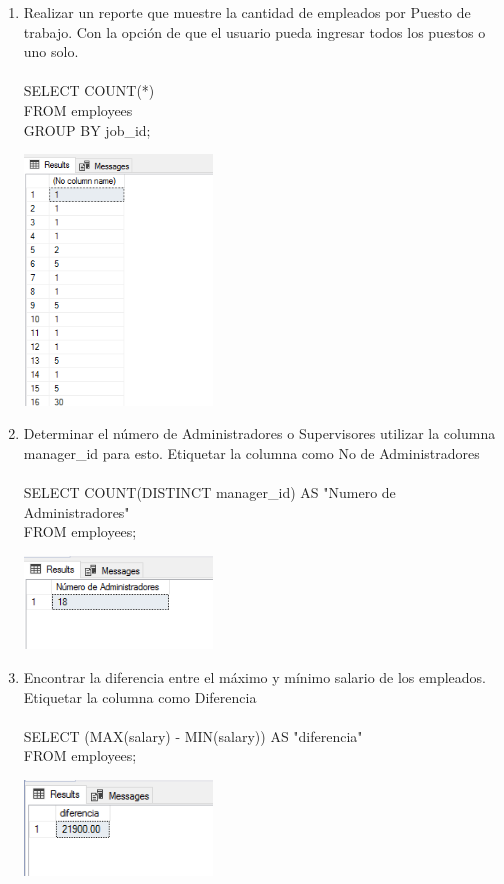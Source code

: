 \begin{enumerate}[1.]
	\item Realizar un reporte que muestre la cantidad de empleados por Puesto de trabajo. Con la opción de que el usuario pueda ingresar todos los puestos o uno solo.
	\\	
	\\SELECT COUNT(*)	
	\\FROM employees
	\\GROUP BY job\_id;
	\begin{center}
	\includegraphics[width=5cm]{./Imagenes/a7a3} 
	\end{center}
	\item Determinar el n\'umero de Administradores o Supervisores utilizar la columna manager\_id para esto. Etiquetar la columna como No de Administradores
	\\	
	\\SELECT COUNT(DISTINCT manager\_id) AS "Numero de Administradores"
	\\FROM employees;
	\begin{center}
	\includegraphics[width=5cm]{./Imagenes/a7a4} 
	\end{center}
	\item Encontrar la diferencia entre el m\'aximo y m\'inimo salario de los empleados. Etiquetar la columna como Diferencia
	\\
	\\SELECT (MAX(salary) - MIN(salary)) AS "diferencia"
	\\FROM employees;
	\begin{center}
	\includegraphics[width=5cm]{./Imagenes/a7a5} 

\end{center}
\end{enumerate}
